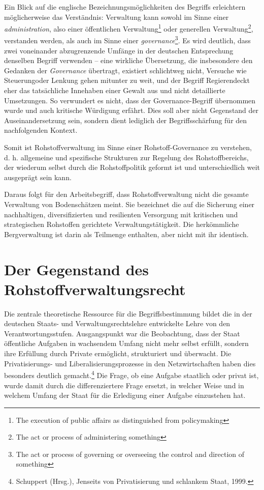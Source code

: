 \documentclass[12pt,a4paper,oneside]{book} %
\begin{document}
{	Ein Blick auf die englische Bezeichnungsmöglichkeiten des Begriffs erleichtern möglicherweise das Verständnis: Verwaltung kann sowohl im Sinne einer \textit{administration}, also  einer öffentlichen Verwaltung\footnote{\glqq The execution of public affairs as distinguished from policymaking} oder generellen Verwaltung\footnote{\glqq The act or process of administering something\grqq}, verstanden werden, als auch im Sinne einer \textit{governance}\footnote{\glqq The act or process of governing or overseeing the control and direction of something\grqq}. Es wird deutlich, dass zwei voneinander abzugrenzende Umfänge in der deutschen Entsprechung denselben Begriff verwenden -- eine wirkliche Übersetzung, die insbesondere den Gedanken der \textit{Governance} übertragt, existiert schlichtweg nicht, Versuche wie \glqq Steuerung\grqq oder \glqq Lenkung \grqq gehen mitunter zu weit, und der Begriff \glqq Regieren\grqq deckt eher das tatsächliche Innehaben einer Gewalt aus und nicht detaillierte Umsetzungen. So verwundert es nicht, dass der Governance-Begriff übernommen wurde\autocite{Verwaltung in Zeiten der Governance, S. 6} und auch kritische Würdigung erfährt.\autocite{Hilz, Governance in der Kritik} Dies soll aber nicht Gegenstand der Auseinandersetzung sein, sondern dient lediglich der Begriffsschärfung für den nachfolgenden Kontext.
	
	Somit ist Rohstoffverwaltung im Sinne einer Rohstoff-Governance zu verstehen, d. h. allgemeine und spezifische Strukturen zur Regelung des Rohstoffbereichs, der wiederum selbst durch die Rohstoffpolitik geformt ist und unterschiedlich weit ausgeprägt sein kann.
	
	Daraus folgt für den Arbeitsbegriff, dass Rohstoffverwaltung nicht die gesamte Verwaltung von Bodenschätzen meint. Sie bezeichnet die auf die Sicherung einer nachhaltigen, diversifizierten und resilienten Versorgung mit kritischen und strategischen Rohstoffen gerichtete Verwaltungstätigkeit. Die herkömmliche Bergverwaltung ist darin als Teilmenge enthalten, aber nicht mit ihr identisch.
	
	\section{Der Gegenstand des Rohstoffverwaltungsrecht}
	
	Die zentrale theoretische Ressource für die Begriffsbestimmung bildet die in der deutschen Staats- und Verwaltungsrechtslehre entwickelte Lehre von den Verantwortungsstufen. Ausgangspunkt war die Beobachtung, dass der Staat öffentliche Aufgaben in wachsendem Umfang nicht mehr selbst erfüllt, sondern ihre Erfüllung durch Private ermöglicht, strukturiert und überwacht. Die Privatisierungs- und Liberalisierungsprozesse in den Netzwirtschaften haben dies besonders deutlich gemacht.\footnote{Schuppert (Hrsg.), Jenseits von Privatisierung und schlankem Staat, 1999.} Die Frage, ob eine Aufgabe staatlich oder privat ist, wurde damit durch die differenziertere Frage ersetzt, in welcher Weise und in welchem Umfang der Staat für die Erledigung einer Aufgabe einzustehen hat.
	
}
\end{document}
